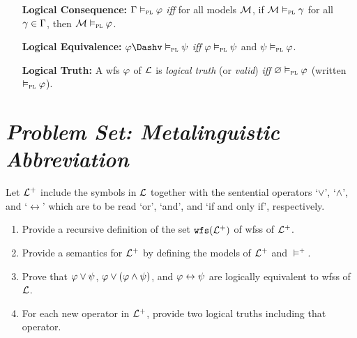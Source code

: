 \documentclass[a4paper, 11pt]{article} %
\begin{document}
\begin{enumerate}[leftmargin=1.2in]
	\item[\bf Logical Consequence:] $\Gamma \vDash_{\textsc{pl}} \varphi$ \textit{iff} for all models $\mathcal{M}$, if $\mathcal{M}\vDash_{\textsc{pl}} \gamma$ for all $\gamma\in\Gamma$, then $\mathcal{M}\vDash_{\textsc{pl}} \varphi$.
	\item[\bf Logical Equivalence:] $\metaA \Dashv\PLmodels \metaB$ \textit{iff} $\varphi\vDash_{\textsc{pl}} \psi$ and $\psi\vDash_{\textsc{pl}} \varphi$.
	\item[\bf Logical Truth:] A wfs $\varphi$ of $\mathcal{L}$ is \textit{logical truth} (or \textit{valid}) \textit{iff} $\varnothing\vDash_{\textsc{pl}} \varphi$ (written $\vDash_{\textsc{pl}} \varphi$).
\end{enumerate}




\section*{\it Problem Set: Metalinguistic Abbreviation}

Let $\mathcal{L}^+$ include the symbols in $\mathcal{L}$ together with the sentential operators `$\vee$', `$\wedge$', and `$\leftrightarrow$' which are to be read `or', `and', and `if and only if', respectively.
\begin{enumerate}[itemsep=2pt]\small
	\item Provide a recursive definition of the set $\texttt{wfs}(\mathcal{L}^+)$ of wfss of $\mathcal{L}^+$.
	\item Provide a semantics for $\mathcal{L}^+$ by defining the models of $\mathcal{L}^+$ and $\vDash^+$.
	\item Prove that $\varphi \vee \psi$, $\varphi \vee (\varphi \wedge \psi)$, and $\varphi\leftrightarrow \psi$ are logically equivalent to wfss of $\mathcal{L}$.
	\item For each new operator in $\mathcal{L}^+$, provide two logical truths including that operator.
\end{enumerate}
\end{document}
